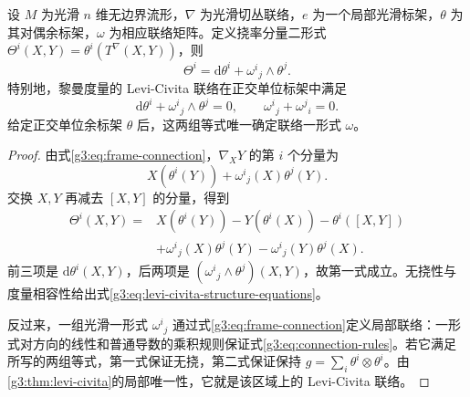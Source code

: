 \begin{proposition}\label{g3:prop:first-structure-equation}
	设 \(M\) 为光滑 \(n\) 维无边界流形，\(\nabla\) 为光滑切丛联络，\(e\) 为一个局部光滑标架，\(\theta\) 为其对偶余标架，\(\omega\) 为相应联络矩阵。定义挠率分量二形式 \(\Theta^i(X,Y)=\theta^i(T^\nabla(X,Y))\)，则
	\begin{equation}\label{g3:eq:first-structure-equation}
		\Theta^i=\mathrm{d}\theta^i+\omega^i{}_j\wedge\theta^j.
	\end{equation}
	特别地，黎曼度量的 Levi-Civita 联络在正交单位标架中满足
	\begin{equation}\label{g3:eq:levi-civita-structure-equations}
		\mathrm{d}\theta^i+\omega^i{}_j\wedge\theta^j=0,
		\qquad \omega^i{}_j+\omega^j{}_i=0.
	\end{equation}
	给定正交单位余标架 \(\theta\) 后，这两组等式唯一确定联络一形式 \(\omega\)。
\end{proposition}
\begin{proof}
	由式\eqref{g3:eq:frame-connection}，\(\nabla_XY\) 的第 \(i\) 个分量为
	\[
		X(\theta^i(Y))+\omega^i{}_j(X)\theta^j(Y).
	\]
	交换 \(X,Y\) 再减去 \([X,Y]\) 的分量，得到
	\begin{align*}
		\Theta^i(X,Y)
		={}&X(\theta^i(Y))-Y(\theta^i(X))-\theta^i([X,Y])\\
		&+\omega^i{}_j(X)\theta^j(Y)-\omega^i{}_j(Y)\theta^j(X).
	\end{align*}
	前三项是 \(\mathrm{d}\theta^i(X,Y)\)，后两项是 \((\omega^i{}_j\wedge\theta^j)(X,Y)\)，故第一式成立。无挠性与度量相容性给出式\eqref{g3:eq:levi-civita-structure-equations}。

	反过来，一组光滑一形式 \(\omega^i{}_j\) 通过式\eqref{g3:eq:frame-connection}定义局部联络：一形式对方向的线性和普通导数的乘积规则保证式\eqref{g3:eq:connection-rules}。若它满足所写的两组等式，第一式保证无挠，第二式保证保持 \(g=\sum_i\theta^i\otimes\theta^i\)。由\cref{g3:thm:levi-civita}的局部唯一性，它就是该区域上的 Levi-Civita 联络。
\end{proof}

